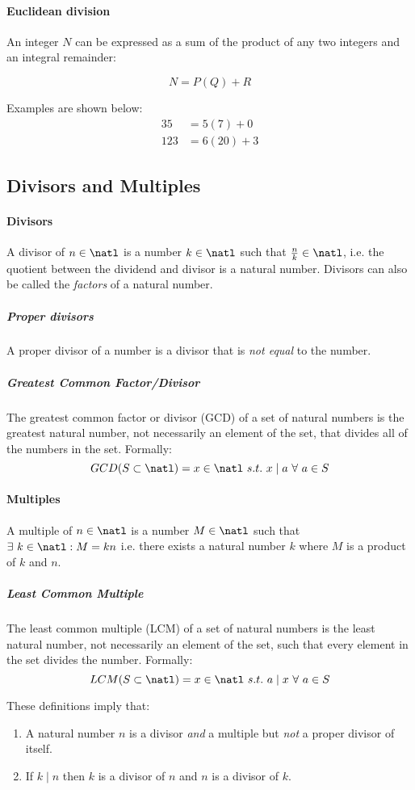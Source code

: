 \paragraph{Euclidean division}
An integer $N$ can be expressed as a sum of the product of any two integers and an integral remainder:

$$N = P(Q)+R$$

Examples are shown below:
\begin{align*}
    35 &= 5(7) + 0 \\
    123 &= 6(20) + 3
\end{align*}

\subsection{Divisors and Multiples}
\paragraph{Divisors}
A divisor of $n \in \natl$ is a number $k \in \natl$ such that $\frac{n}{k} \in \natl$, i.e. the quotient between the dividend and divisor is a natural number.
Divisors can also be called the \emph{factors} of a natural number.

\subparagraph{Proper divisors}
A proper divisor of a number is a divisor that is \emph{not equal} to the number.

\subparagraph{Greatest Common Factor/Divisor}
The greatest common factor or divisor (GCD) of a set of natural numbers is the greatest natural number, not necessarily an element of the set, that divides all of the numbers in the set.
Formally:
\[
GCD(S \subset \natl) = x \in \natl\ s.t.\ x \mid a\ \forall\ a \in S
\]

\paragraph{Multiples}
A multiple of $n \in \natl$ is a number $M \in \natl$ such that $\exists\ k \in \natl : M = kn$ i.e. there exists a natural number $k$ where $M$ is a product of $k$ and $n$.

\subparagraph{Least Common Multiple}
The least common multiple (LCM) of a set of natural numbers is the least natural number, not necessarily an element of the set, such that every element in the set divides the number.
Formally:
\[
LCM(S \subset \natl) = x \in \natl\ s.t.\ a \mid x\ \forall\ a \in S
\]

These definitions imply that:
\begin{enumerate}
    \item A natural number $n$ is a divisor \emph{and} a multiple but \emph{not} a proper divisor of itself.
    \item If $k \mid n$ then $k$ is a divisor of $n$ and $n$ is a divisor of $k$.
\end{enumerate}

